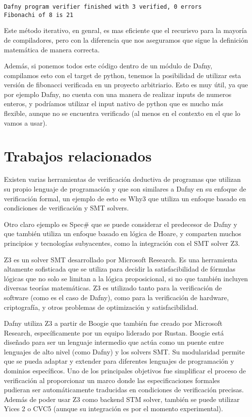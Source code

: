 \documentclass[runningheads]{llncs}
\begin{document}
\begin{verbatim}
Dafny program verifier finished with 3 verified, 0 errors
Fibonachi of 8 is 21
\end{verbatim}

Este método iterativo, en genral, es mas eficiente que el recurisvo para la mayoría de compiladores, pero con la diferencia que nos aseguramos que sigue la definición matemática de manera correcta.

Además, si ponemos todos este código dentro de un módulo de Dafny, compilamos esto con el target de python, tenemos la posibilidad de utilizar esta versión de fibonacci verificada
en un proyecto arbitriario. Esto es muy útil, ya que por ejemplo Dafny, no cuenta con una manera de realizar inputs de numeros enteros, y podríamos utilizar el input nativo de 
python que es mucho más flexible, aunque no se encuentra verificado (al menos en el contexto en el que lo vamos a usar).


\section{Trabajos relacionados} 
Existen varias herramientas de verificación deductiva de programas que utilizan su propio lenguaje de programación 
y que son similares a Dafny en su enfoque de verificación formal, 
un ejemplo de esto es Why3 que utiliza un enfoque basado en condiciones de verificación y SMT solvers.

Otro claro ejemplo es Spec\# que se puede considerar el predecesor de Dafny y que también utiliza un enfoque basado en lógica de Hoare,
y comparten muchos principios y tecnologías subyacentes, como la integración con el SMT solver Z3.

Z3 es un solver SMT desarrollado por Microsoft Research. 
Es una herramienta altamente sofisticada que se utiliza para decidir la satisfacibilidad de fórmulas lógicas que no solo se limitan a la lógica proposicional, 
si no que también incluyen diversas teorías matemáticas.
Z3 es utilizado tanto para la verificación de software (como es el caso de Dafny),
como para la verificación de hardware, criptografía, y otros problemas de optimización y satisfacibilidad.

Dafny utiliza Z3 a partir de Boogie que también fue creado por Microsoft Research, específicamente por un equipo liderado por Rustan. 
Boogie está diseñado para ser un lenguaje intermedio que actúa como un puente entre lenguajes de alto nivel (como Dafny) y los solvers SMT. 
Su modularidad permite que se pueda adaptar y extender para diferentes lenguajes de programación y dominios específicos.
Uno de los principales objetivos fue simplificar el proceso de verificación al proporcionar un marco donde las especificaciones formales pudieran ser automáticamente 
traducidas en condiciones de verificación precisas. Además de poder usar Z3 como backend STM solver, 
también se puede utilizar Yices 2 o CVC5 (aunque su integración es por el momento experimental).
\end{document}
